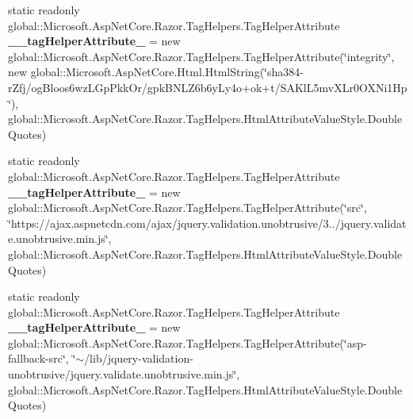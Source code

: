 \begin{DoxyCompactItemize}
\item 
\mbox{\label{class_asp_net_core_1_1_views___shared_____validation_scripts_partial_abbecf0edd8c233e6bd83933b4f478f3c}} 
static readonly global\+::\+Microsoft.\+Asp\+Net\+Core.\+Razor.\+Tag\+Helpers.\+Tag\+Helper\+Attribute {\bfseries \+\_\+\+\_\+tag\+Helper\+Attribute\+\_} = new global\+::\+Microsoft.\+Asp\+Net\+Core.\+Razor.\+Tag\+Helpers.\+Tag\+Helper\+Attribute(\char`\"{}integrity\char`\"{}, new global\+::\+Microsoft.\+Asp\+Net\+Core.\+Html.\+Html\+String(\char`\"{}sha384-\/r\+Zfj/og\+Bloos6wz\+L\+Gp\+Pkk\+Or/gpk\+B\+N\+L\+Z6b6y\+Ly4o+ok+t/S\+A\+Kl\+L5mv\+X\+Lr0\+O\+X\+Ni1\+Hp\char`\"{}), global\+::\+Microsoft.\+Asp\+Net\+Core.\+Razor.\+Tag\+Helpers.\+Html\+Attribute\+Value\+Style.\+Double\+Quotes)
\item 
\mbox{\label{class_asp_net_core_1_1_views___shared_____validation_scripts_partial_ac6528f748426cbb4bd4b6c3a29795dbc}} 
static readonly global\+::\+Microsoft.\+Asp\+Net\+Core.\+Razor.\+Tag\+Helpers.\+Tag\+Helper\+Attribute {\bfseries \+\_\+\+\_\+tag\+Helper\+Attribute\+\_} = new global\+::\+Microsoft.\+Asp\+Net\+Core.\+Razor.\+Tag\+Helpers.\+Tag\+Helper\+Attribute(\char`\"{}src\char`\"{}, \char`\"{}https\+://ajax.\+aspnetcdn.\+com/ajax/jquery.\+validation.\+unobtrusive/3../jquery.\+validate.\+unobtrusive.\+min.\+js\char`\"{}, global\+::\+Microsoft.\+Asp\+Net\+Core.\+Razor.\+Tag\+Helpers.\+Html\+Attribute\+Value\+Style.\+Double\+Quotes)
\item 
\mbox{\label{class_asp_net_core_1_1_views___shared_____validation_scripts_partial_a54e2ee612e16614cf86cb93daf4fa2e8}} 
static readonly global\+::\+Microsoft.\+Asp\+Net\+Core.\+Razor.\+Tag\+Helpers.\+Tag\+Helper\+Attribute {\bfseries \+\_\+\+\_\+tag\+Helper\+Attribute\+\_} = new global\+::\+Microsoft.\+Asp\+Net\+Core.\+Razor.\+Tag\+Helpers.\+Tag\+Helper\+Attribute(\char`\"{}asp-\/fallback-\/src\char`\"{}, \char`\"{}$\sim$/lib/jquery-\/validation-\/unobtrusive/jquery.\+validate.\+unobtrusive.\+min.\+js\char`\"{}, global\+::\+Microsoft.\+Asp\+Net\+Core.\+Razor.\+Tag\+Helpers.\+Html\+Attribute\+Value\+Style.\+Double\+Quotes)
\item 
\mbox{\label{class_asp_net_core_1_1_views___shared_____validation_scripts_partial_a9f1b0b31fdadda24dd2dc88b915f3da5}} 

\end{DoxyCompactItemize}
